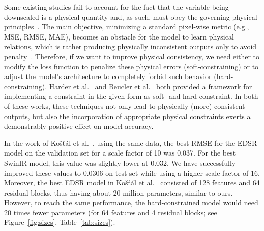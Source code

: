 Some existing studies fail to account for the fact that the variable being downscaled is a physical quantity and, as such, must obey the governing physical principles~\cite{Beucler2021}. 
The main objective, minimizing a standard pixel-wise metric (e.g., MSE, RMSE, MAE), becomes an obstacle for the model to learn physical relations, which is rather producing physically inconsistent outputs only to avoid penalty~\cite{Beucler2021}. 
Therefore, if we want to improve physical consistency, we need either to modify the loss function to penalize these physical errors (soft-constraining) or to adjust the model's architecture to completely forbid such behavior (hard-constraining).
Harder et al.~\cite{Harder2023} and Beucler et al.~\cite{Beucler2021} both provided a framework for implementing a constraint in the given form as soft- and hard-constraint. 
In both of these works, these techniques not only lead to physically (more) consistent outputs, but also the incorporation of appropriate physical constraints exerts a demonstrably positive effect on model accuracy.


In the work of Košťál et al.~\cite{Kostal2025}, using the same data, the best RMSE for the EDSR model on the validation set for a scale factor of 10 was 0.037.
For the best SwinIR model, this value was slightly lower at 0.032.
We have successfully improved these values to 0.0306 on test set while using a higher scale factor of 16.
Moreover, the best EDSR model in Košťál et al.~\cite{Kostal2025} consisted of 128 features and 64 residual blocks, thus having about 20 million parameters, similar to ours.
However, to reach the same performance, the hard-constrained model would need 20 times fewer parameters (for 64 features and 4 residual blocks; see Figure~\ref{fig:sizes}, Table~\ref{tab:sizes}).

